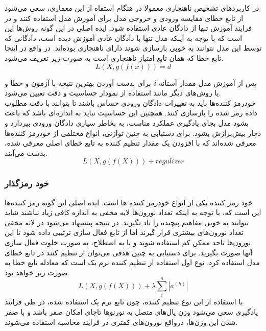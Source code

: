\documentclass[12pt,a4paper]{report}
\begin{document}
در کاربردهای تشخیص ناهنجاری معمولا در هنگام استفاه از این معماری، سعی می‌شود از تابع خطای مقایسه ورودی و خروجی مدل برای آموزش مدل استفاده کنند و در فرایند آموزش تنها از دادگان عادی استفاده شود. ایده اصلی در این گونه روش‌ها این است که با توجه به اینکه مدل تنها با دادگان عادی آموزش دیده است، دادگانی که توسط این مدل نتوانند به خوبی بازسازی شوند دارای ناهنجاری بوده‌اند. در واقع در اینجا تابع خطا که همان تابع امتیاز ناهنجاری است به صورت زیر تعریف می‌شود.
\begin{equation}
	L(X, g(f(x))) = d
\end{equation}

پس از آموزش مدل مقدار آستانه $\delta$ برای بدست آوردن بهترین نتیجه با آزمون و خطا و یا روش‌های دیگر مانند استفاده از نمودار حساسیت و دقت تعیین می‌شود. \\

خودرمز کننده‌ها باید به تغییرات دادگان ورودی حساس باشند تا بتوانند با دقت مطلوب داده رمز شده را بازسازی کنند. همچنین این حساسیت نباید به اندازه‌ای باشد که باعث بشود مدل بجای یادگیری عملکرد مناسب، به بخاطر سپاری دادگان ورودی بپردازد و دچار بیش‌برازش بشود. برای دستیابی به چنین توازنی، انواع مختلفی از خودرمز کننده‌ها معرفی شده‌اند که با افزودن یک مقدار تنظیم کننده به تابع خطای اصلی معرفی شده، بدست می‌آیند.
\begin{equation}
	L(X, g(f(X))) + regulizer
\end{equation}

\subsubsection{خود رمزگذار }
خود رمز کننده  یکی از انواع خودرمز کننده ها است. ایده اصلی این گونه رمز کننده‌ها این است که، با توجه به اینکه تعداد نورون‌ها لایه مخفی به اندازه کافی زیاد نباشند شاید نتوانند به خوبی مفاهیم پیچیده را یاد بگیرند. در نتیجه پیشنهاد می‌شود در لایه مخفی تعداد نورون‌های بیشتری قرار گیرند اما از تابع فعال سازی ترتیبی داده شود تا این نورون‌ها تاحد ممکن کم استفاده شوند و یا به اصطلاح، به صورت خلوت فعال سازی آنها صورت بگیرید. برای دستیابی به چنین هدفی می‌توان از تنظیم کنند در تابع خطای مدل استفاده کرد. نوع اول استفاده از تنظیم کننده نرم یک است که معادله تابع خطا به صورت زیر خواهد بود.
\begin{equation}
L(X, g(f(X))) + \lambda \sum_{i}^{n}|a^{(h)}|
\end{equation}
با استفاده از این نوع تنظیم کننده، چون تابع نرم یک استفاده شده، در طی فرایند یادگیری سعی می‌شود وزن یال‌های متصل به نورنو‌ها تاجای امکان صفر باشد و با صفر شدن این وزن‌ها، درواقع نورون‌های کمتری در فرایند محاسبه استفاده می‌شوند. 
\end{document}
